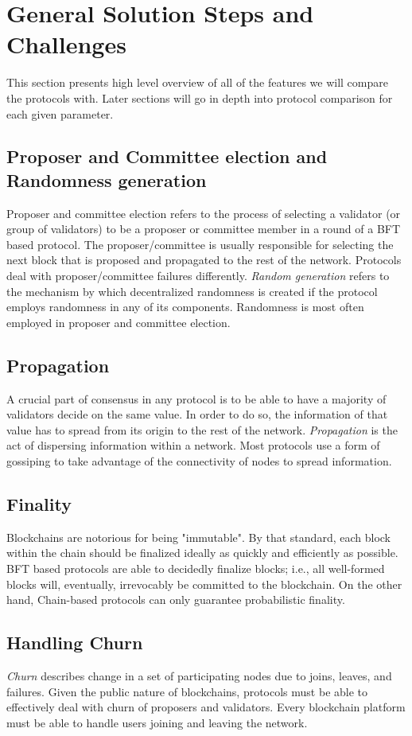 \documentclass[10pt,journal,compsoc]{IEEEtran}
\begin{document}
\section{General Solution Steps and Challenges}
This section presents high level overview of all of the features we will compare the protocols with. Later sections will go in depth into protocol comparison for each given parameter.

\subsection{Proposer and Committee election and Randomness generation}
Proposer and committee election refers to the process of selecting a validator (or group of validators) to be a proposer or committee member in a round of a BFT based protocol. The proposer/committee is usually responsible for selecting the next block that is proposed and propagated to the rest of the network. Protocols deal with proposer/committee failures differently. \emph{Random generation} refers to the mechanism by which decentralized randomness is created if the protocol employs randomness in any of its components. Randomness is most often employed in proposer and committee election.
 
\subsection{Propagation}
A crucial part of consensus in any protocol is to be able to have a majority of validators decide on the same value. In order to do so, the information of that value has to spread from its origin to the rest of the network. \emph{Propagation} is the act of dispersing information within a network. Most protocols use a form of gossiping to take advantage of the connectivity of nodes to spread information.

\subsection{Finality}
Blockchains are notorious for being "immutable". By that standard, each block within the chain should be finalized ideally as quickly and efficiently as possible. BFT based protocols are able to decidedly finalize blocks; i.e., all well-formed blocks will, eventually, irrevocably be committed to the blockchain. On the other hand, Chain-based protocols can only guarantee probabilistic finality.

\subsection{Handling Churn}
\emph{Churn} describes change in a set of participating nodes due to joins, leaves, and failures. \cite{GodfreyEtAl} Given the public nature of blockchains, protocols must be able to effectively deal with churn of proposers and validators. Every blockchain platform must be able to handle users joining and leaving the network.
\end{document}
